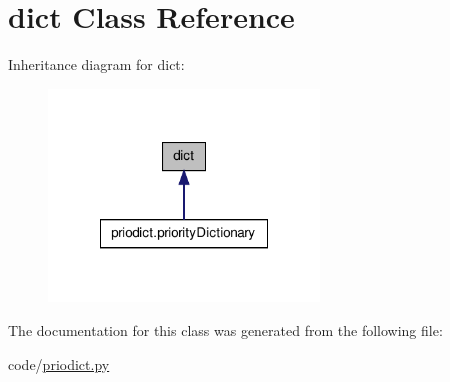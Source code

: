 \hypertarget{classdict}{\section{dict Class Reference}
\label{classdict}
}


Inheritance diagram for dict\-:\nopagebreak
\begin{figure}[H]
\begin{center}
\leavevmode
\includegraphics[width=204pt]{classdict__inherit__graph}
\end{center}
\end{figure}


The documentation for this class was generated from the following file\-:\begin{DoxyCompactItemize}
\item 
code/\hyperlink{priodict_8py}{priodict.\-py}\end{DoxyCompactItemize}
